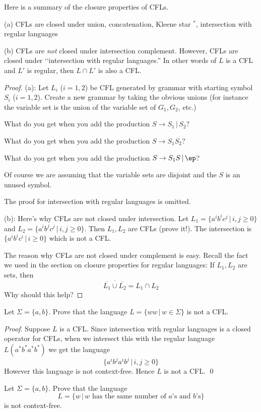 \begin{prop} Here is a summary of the closure properties of CFLs.
 \begin{tightlist}
  \item[(a)] CFLs are closed under union, concatenation, Kleene star
  ${}^*$, intersection with regular languages
  \item[(b)] CFLs are \textit{ not} closed under intersection
  complement.
  However, CFLs are closed under \lq\lq intersection with
  regular languages.''
  In other words of $L$ is a CFL and $L'$ is regular,
  then $L \cap L'$ is also a CFL.
 \end{tightlist}
\end{prop}

\begin{proof}

(a): Let $L_i$ ($i=1,2$) be CFL generated by grammar with starting
symbol $S_i$ ($i=1,2$). Create a new grammar by taking the obvious
unions (for instance the variable set is the union of the variable
set of $G_1, G_2$, etc.)
\begin{mylist}
 \item What do you get when you add the production $S \rightarrow
 S_1 \,|\, S_2$?
 \item What do you get when you add the production $S \rightarrow
 S_1 S_2$?
 \item What do you get when you add the production $S \rightarrow
 S_1S \,|\, \ep$?
\end{mylist}
Of course we are assuming that the variable sets are disjoint and
the $S$ is an unused symbol.

The proof for intersection with regular languages is omitted.

(b): Here's why CFLs are not closed under intersection. Let $L_1 =
\{a^ib^ic^j \,|\, i,j \geq 0\}$ and $L_2 = \{a^ib^jc^j \,|\, i,j
\geq 0\}$. Then $L_1, L_2$ are CFLs (prove it!). The intersection
is $\{a^i b^i c^i \,|\, i \geq 0\}$ which is not a CFL.

The reason why CFLs are not closed under complement is easy.
Recall the fact we used in the section on closure properties for
regular languages: If $L_1, L_2$ are sets, then
\[
 \overline{ \overline{L_1} \cup \overline{L_2}} = L_1 \cap L_2
\]
Why should this help?
\end{proof}



\newpage
\begin{eg}
  Let $\Sigma = \{a,b\}$.
  Prove that the language $L = \{ww \,|\, w \in \Sigma \}$ is not a CFL.
\end{eg}

\textit{Proof}.
Suppose $L$ is a CFL. Since intersection with regular languages is a closed
operator for CFLs, when we intersect this with the
regular language $L(a^*b^*a^*b^*)$
we get the
language
\[
\{a^i b^j a^ib^j \,|\, i,j \geq 0 \}
\]
However this language is not context-free.
Hence $L$ is not a CFL.
\qed

\newpage
\begin{eg}
  Let $\Sigma = \{ a, b \}$.
  Prove that the language
  \[
  L = \{w \,|\, w \text{ has the same number of $a$'s and $b$'s} \}
  \]
  is not context-free.
\end{eg}
